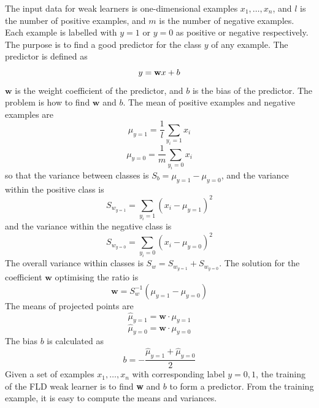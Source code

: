 The input data for weak learners is one-dimensional examples $x_{1},\ldots, x_{n}$, and $l$ is the number of positive examples, and $m$ is the number of negative examples. Each example is labelled with $y=1$ or $y=0$ as positive or negative respectively. The purpose is to find a good predictor for the class $y$ of any example. The predictor is defined as
\begin{equation}
 y= \textbf{\textrm{w}}x + b
\end{equation}
$\textbf{w}$ is the weight coefficient of the predictor, and $b$ is the bias of the predictor. The problem is how to find $\textbf{w}$ and $b$. The mean of positive examples and negative examples are
\begin{equation}
 \mu_{y=1}=\frac{1}{l}\sum_{y_{i}=1}x_{i}
\end{equation}
\begin{equation}
 \mu_{y=0}=\frac{1}{m}\sum_{y_{i}=0}x_{i}
\end{equation}
so that the variance between classes is $S_{b}=\mu_{y=1}-\mu_{y=0}$, and the variance within the positive class is
\begin{equation}
 S_{w_{y=1}}=\sum_{y_{i}=1} (x_{i}-\mu_{y=1})^2
\end{equation}
and the variance within the negative class is 
\begin{equation}
 S_{w_{y=0}}=\sum_{y_{i}=0} (x_{i}-\mu_{y=0})^2
\end{equation}
The overall variance within classes is $S_{w}=S_{w_{y=1}}+S_{w_{y=0}}$. The solution for the coefficient $\textbf{w}$ optimising the ratio is 
\begin{equation}
 \textbf{w}= S_{w}^{-1}(\mu_{y=1}-\mu_{y=0})
\end{equation}
The means of projected points are 
\begin{equation}
 \widehat{\mu}_{y=1}=\textbf{w}\cdot\mu_{y=1}
\end{equation}
\begin{equation}
 \widehat{\mu}_{y=0}=\textbf{w}\cdot\mu_{y=0}
\end{equation}
The bias $b$ is calculated as
\begin{equation}
 b=-\frac{\widehat{\mu}_{y=1}+\widehat{\mu}_{y=0}}{2}
\end{equation}
Given a set of examples $x_{1},\ldots, x_{n}$ with corresponding label $y=0,1$, the training of the FLD weak learner is to find  \textbf{w} and $b$ to form a predictor. From the training example, it is easy to compute the means and variances.

